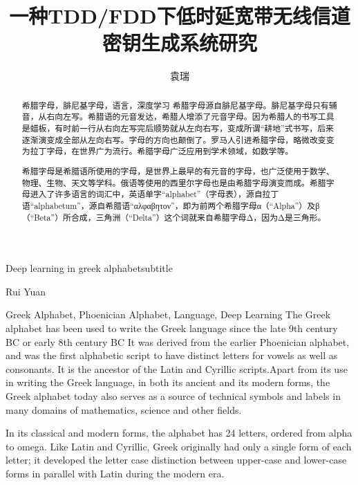 \documentclass[master]{seuthesis} %
\begin{document}

\title{一种TDD/FDD下低时延宽带无线信道密钥生成系统研究}{}{Deep learning in greek alphabet}{subtitle}
\author{袁瑞}{Rui Yuan}

\address{东南大学}
\maketitle

\begin{abstract}{希腊字母，腓尼基字母，语言，深度学习}
希腊字母源自腓尼基字母。腓尼基字母只有辅音，从右向左写。希腊语的元音发达，希腊人增添了元音字母。因为希腊人的书写工具是蜡板，有时前一行从右向左写完后顺势就从左向右写，变成所谓“耕地”式书写，后来逐渐演变成全部从左向右写。字母的方向也颠倒了。罗马人引进希腊字母，略微改变变为拉丁字母，在世界广为流行。希腊字母广泛应用到学术领域，如数学等。

希腊字母是希腊语所使用的字母，是世界上最早的有元音的字母，也广泛使用于数学、物理、生物、天文等学科。俄语等使用的西里尔字母也是由希腊字母演变而成。希腊字母进入了许多语言的词汇中，英语单字“alphabet”（字母表），源自拉丁语“alphabetum”，源自希腊语“αλφαβητον”，即为前两个希腊字母α（“Alpha”）及β（“Beta”）所合成，三角洲（“Delta”）这个词就来自希腊字母Δ，因为Δ是三角形。
\end{abstract}

\begin{englishabstract}{Greek Alphabet, Phoenician Alphabet, Language, Deep Learning}
The Greek alphabet has been used to write the Greek language since the late 9th century BC or early 8th century BC It was derived from the earlier Phoenician alphabet, and was the first alphabetic script to have distinct letters for vowels as well as consonants. It is the ancestor of the Latin and Cyrillic scripts.Apart from its use in writing the Greek language, in both its ancient and its modern forms, the Greek alphabet today also serves as a source of technical symbols and labels in many domains of mathematics, science and other fields.

In its classical and modern forms, the alphabet has 24 letters, ordered from alpha to omega. Like Latin and Cyrillic, Greek originally had only a single form of each letter; it developed the letter case distinction between upper-case and lower-case forms in parallel with Latin during the modern era.
\end{englishabstract}
\end{document}
